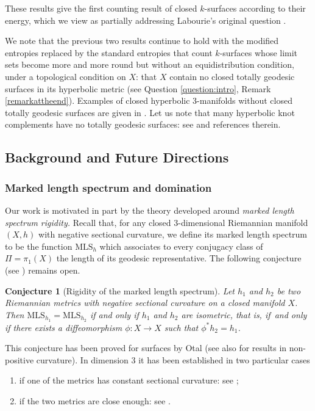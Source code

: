 \documentclass[10pt]{amsart}
\newcommand{\ksurfaces}{$k$\nobreakdash-surfaces\xspace}
\theoremstyle{plain}
\newtheorem{conjecture}[theorem]{Conjecture}
\theoremstyle{definition}
\newcommand{\MLS}{\mathrm{MLS}}
\let\Subsection\subsection\let\Subsubsection\subsubsection
\begin{document}
These results give the first counting result of closed \ksurfaces according to their energy, which we view as partially addressing Labourie's original question \cite[Quest.\,(ii) p.\,243]{LabourieInvent}.

We note that the previous two results continue to hold with the modified entropies replaced by the standard entropies that count \ksurfaces whose limit sets become more and more round but without an equidistribution condition, under a topological condition on $X$: that $X$ contain no closed totally geodesic surfaces in its hyperbolic metric (see Question \ref{question:intro}, Remark \ref{remarkattheend}). Examples of closed hyperbolic 3-manifolds without closed totally geodesic surfaces are given in \cite{MR03}. Let us note that many hyperbolic knot complements have no totally geodesic surfaces: see \cite{Basilio_Lee_Malionek,Reid} and references therein.

\Subsection{Background and Future Directions}

\subsubsection{Marked length spectrum and domination}

Our work is motivated in part by the theory developed around \textit{marked length spectrum rigidity.} Recall that, for any closed $3$\nobreakdash-dimensional Riemannian manifold $(X,h)$ with negative sectional curvature, we define its marked length spectrum to be the function $\MLS_h$ which associates to every conjugacy class of $\Pi=\pi_1(X)$ the length of its geodesic representative. The following conjecture (see \cite[Prob.\,3.1]{BurnsKatok}) remains open.
\begin{conjecture}[Rigidity of the marked length spectrum]
Let $h_1$ and $h_2$ be two Riemannian metrics with negative sectional curvature on a closed manifold $X$. Then $\mathrm{MLS}_{h_1}=\mathrm{MLS}_{h_2}$ if and only if $h_1$ and $h_2$ are isometric, that is, if~and only if there exists a diffeomorphism $\phi:X\to X$ such that $\phi^\ast h_2=h_1$.
\end{conjecture}

This conjecture has been proved for surfaces by Otal \cite{Otal} (see also \cite{Croke} for results in non-positive curvature). In dimension $3$ it has been established in two particular cases
\begin{enumerate}
\item if one of the metrics has constant sectional curvature: see \cite{besson1996minimal,HamenstadtMLS};
\item if the two metrics are close enough: see \cite{GuillarmouLefeuvre}.
\end{enumerate}
\end{document}
